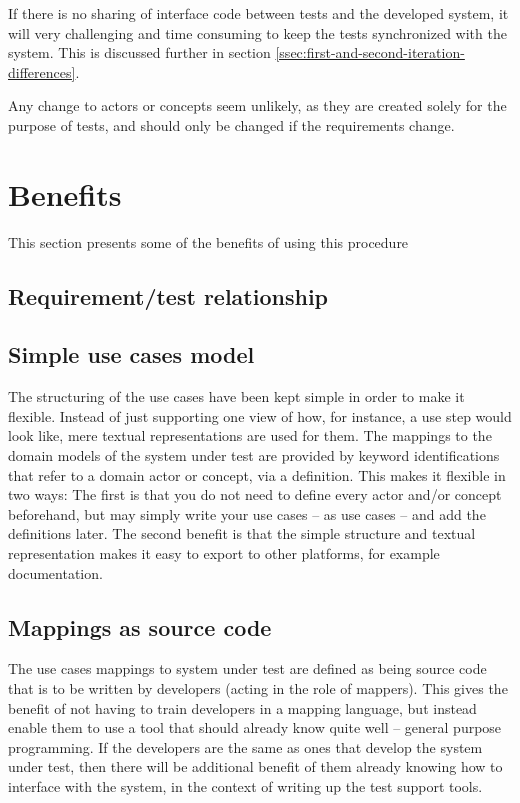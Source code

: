 \noindent If there is no sharing of interface code between tests and the developed system, it will very challenging and time consuming to keep the tests synchronized with the system. This is discussed further in section \ref{ssec:first-and-second-iteration-differences}.\medskip

\noindent Any change to actors or concepts seem unlikely, as they are created solely for the purpose of tests, and should only be changed if the requirements change.

\section{Benefits}
This section presents some of the benefits of using this procedure

\subsection{Requirement/test relationship}

\subsection{Simple use cases model}
The structuring of the use cases have been kept simple in order to make it flexible. Instead of just supporting one view of how, for instance, a use step would look like, mere textual representations are used for them. The mappings to the domain models of the system under test are provided by keyword identifications that refer to a domain actor or concept, via a definition. This makes it flexible in two ways: The first is that you do not need to define every actor and/or concept beforehand, but may simply write your use cases -- as use cases -- and add the definitions later. The second benefit is that the simple structure and textual representation makes it easy to export to other platforms, for example documentation.

\subsection{Mappings as source code}
The use cases mappings to system under test are defined as being source code that is to be written by developers (acting in the role of mappers). This gives the benefit of not having to train developers in a mapping language, but instead enable them to use a tool that should already know quite well -- general purpose programming. If the developers are the same as ones that develop the system under test, then there will be additional benefit of them already knowing how to interface with the system, in the context of writing up the test support tools.\medskip

